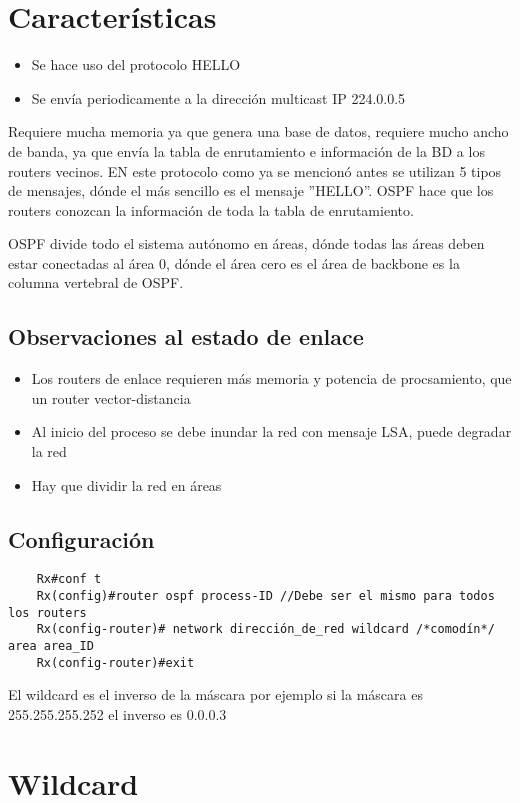 \section{Características}
\begin{itemize}
    \item {Se hace uso del protocolo HELLO}
    \item Se envía periodicamente a la dirección multicast IP 224.0.0.5
\end{itemize}

Requiere mucha memoria ya que genera una base de datos, requiere mucho ancho de banda, ya que envía la tabla de enrutamiento e información de la BD a los routers vecinos. EN este protocolo como ya se mencionó antes se utilizan 5 tipos de mensajes, dónde el más sencillo es el mensaje ''HELLO''. 
OSPF hace que los routers conozcan la información de toda la tabla de enrutamiento.

OSPF divide todo el sistema autónomo en áreas, dónde todas las áreas deben estar conectadas al área 0, dónde el área cero es el área de backbone es la columna vertebral de OSPF.
\subsection{Observaciones al estado de enlace}
\begin{itemize}
    \item {Los routers de enlace requieren más memoria y potencia de procsamiento, que un router vector-distancia}
    \item {Al inicio del proceso se debe inundar la red con mensaje LSA, puede degradar la red}
    \item {Hay que dividir la red en áreas}
\end{itemize}
\subsection{Configuración}
\begin{lstlisting}
    Rx#conf t
    Rx(config)#router ospf process-ID //Debe ser el mismo para todos los routers
    Rx(config-router)# network dirección_de_red wildcard /*comodín*/ area area_ID
    Rx(config-router)#exit
\end{lstlisting}
El wildcard es el inverso de la máscara por ejemplo si la máscara es 255.255.255.252 el inverso es 0.0.0.3

\section{Wildcard}
